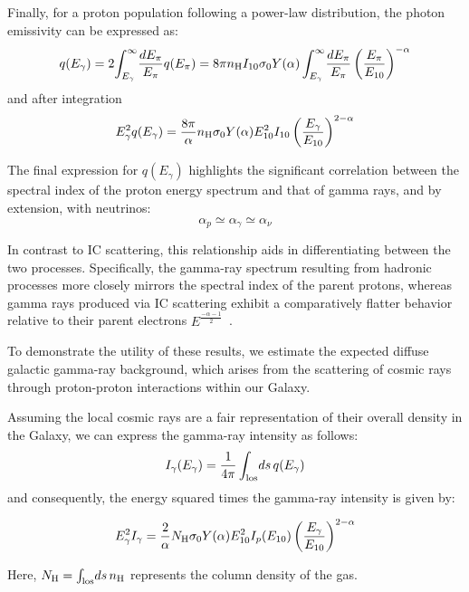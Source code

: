 Finally, for a proton population following a power-law distribution, the photon emissivity can be expressed as:
%
\begin{equation}
q(E_\gamma) = 2 \! \int_{E_\gamma}^\infty \! \frac{dE_\pi}{E_\pi} q(E_\pi) = 
8 \pi n_{\rm H} I_{10} \sigma_0 Y(\alpha) \int_{E_\gamma}^\infty \! \frac{dE_\pi}{E_\pi}  \left(\frac{E_\pi}{E_{10}} \right)^{-\alpha}
\end{equation}
%
and after integration
%
\begin{equation}
E_\gamma^2 q(E_\gamma) = \frac{8 \pi}{\alpha} n_{\rm H}  \sigma_0 Y(\alpha) E_{10}^2 I_{10} \left( \frac{E_\gamma}{E_{10}} \right)^{2-\alpha}
\end{equation}

The final expression for \( q(E_\gamma) \) highlights the significant correlation between the spectral index of the proton energy spectrum and that of gamma rays, and by extension, with neutrinos:
%
\[
\alpha_p \simeq \alpha_\gamma \simeq \alpha_\nu
\]

In contrast to IC scattering, this relationship aids in differentiating between the two processes. Specifically, the gamma-ray spectrum resulting from hadronic processes more closely mirrors the spectral index of the parent protons, whereas gamma rays produced via IC scattering exhibit a comparatively flatter behavior relative to their parent electrons $E^{\frac{-\alpha-1}{2}}$~.

To demonstrate the utility of these results, we estimate the expected diffuse galactic gamma-ray background, which arises from the scattering of cosmic rays through proton-proton interactions within our Galaxy.

Assuming the local cosmic rays are a fair representation of their overall density in the Galaxy, we can express the gamma-ray intensity as follows:
%
\begin{equation}
I_\gamma(E_\gamma) = \frac{1}{4\pi} \int_{\rm los} \! ds \, q(E_\gamma) 
\end{equation}
%
and consequently, the energy squared times the gamma-ray intensity is given by:
%
\begin{remark}
\begin{equation}
E_\gamma^2 I_\gamma = \frac{2}{\alpha} N_{\rm H} \sigma_0 Y(\alpha) E_{10}^2 I_p(E_{10})  \left( \frac{E_\gamma}{E_{10}} \right)^{2-\alpha}
\end{equation}
\end{remark}

Here, \( N_{\rm H} = \int_{\rm los} \! ds \, n_{\rm H} \) represents the column density of the gas.

